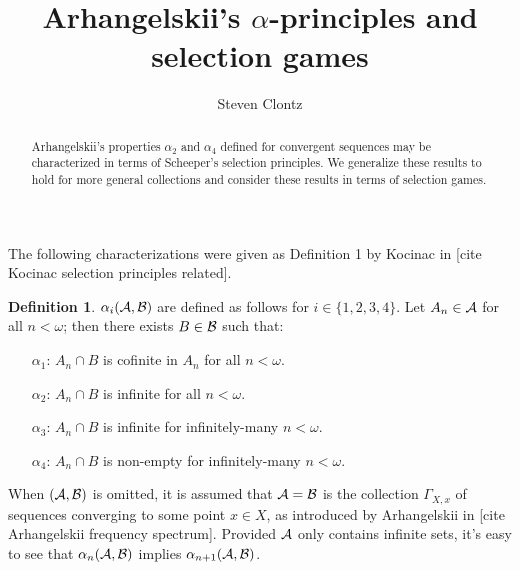 \documentclass{amsart}
\theoremstyle{plain}
\theoremstyle{definition}
\newtheorem{definition}[theorem]{Definition}
\theoremstyle{remark}
\theoremstyle{plain}
\theoremstyle{definition}
\theoremstyle{remark}
\begin{document}
\title{Arhangelskii's \(\alpha\)-principles and selection games}



\author{Steven Clontz}
\address{Department of Mathematics and Statistics,
The University of South Alabama,
Mobile, AL 36688}







\begin{abstract}
Arhangelskii's properties \(\alpha_2\) and \(\alpha_4\)
defined for convergent sequences
may be characterized in terms of Scheeper's selection principles.
We generalize these results to hold for more general collections
and consider these results in terms of selection games.
\end{abstract}


\maketitle



The following characterizations were given as Definition 1 by Kocinac in
[cite Kocinac selection principles related].

\begin{definition}
 \(\alpha_i(\mathcal{A},\mathcal{B})\) are defined as follows
for \(i\in\{1,2,3,4\}\).
Let \(A_n\in\mathcal{A}\) for all \(n<\omega\); then there exists \(B\in\mathcal{B}\) such that:
\begin{itemize}
\item[\(\alpha_1\):] \(A_n\cap B\) is cofinite in \(A_n\) for all \(n<\omega\).
\item[\(\alpha_2\):] \(A_n\cap B\) is infinite for all \(n<\omega\).
\item[\(\alpha_3\):] \(A_n\cap B\) is infinite for infinitely-many \(n<\omega\).
\item[\(\alpha_4\):] \(A_n\cap B\) is non-empty for infinitely-many \(n<\omega\).
\end{itemize}
\end{definition}

When \((\mathcal{A},\mathcal{B})\) is omitted, it is assumed that \(\mathcal{A}=\mathcal{B}\) is the
collection \(\Gamma_{X,x}\) of sequences converging to some point \(x\in X\),
as introduced by Arhangelskii in [cite Arhangelskii frequency spectrum].
Provided \(\mathcal{A}\) only contains infinite sets, it's easy to see that
\(\alpha_n(\mathcal{A},\mathcal{B})\) implies \(\alpha_{n+1}(\mathcal{A},\mathcal{B})\).
\end{document}
